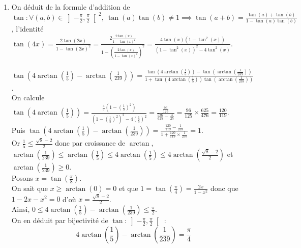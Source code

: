 \documentclass{book}
\begin{document}
\begin{enumerate}[leftmargin=*]
		$\forall x\in ]-1,1[,\ g'(x)=\displaystyle\frac{1}{\sqrt{1-x^2}}-\frac{1}{\sqrt{1-x^2}}=0$.\\
		Donc $\exists C'\in \R,\ \forall x\in ]-1,1[,\ g(x)=C'$.\\
		On calcule $C'=\displaystyle\lim_{x\to 1}g(x)=g(1)=\frac{\pi}{2}-0=\frac{\pi}{2}$.\\
		Ainsi $\forall x\in [-1,1],\ \arcsin(x)+\arccos(x)=\displaystyle\frac{\pi}{2}$.
		\item On déduit de la formule d'addition de $\tan : \forall (a,b)\in \displaystyle\left]-\frac{\pi}{2},\frac{\pi}{2}\right[^2,\ \tan(a)\tan(b)\ne 1\implies\tan(a+b)=\frac{\tan(a)+\tan(b)}{1-\tan(a)\tan(b)}$, l'identité $\tan(4x)=\displaystyle\frac{2\tan(2x)}{1-\tan(2x)^2}=\frac{\displaystyle2\frac{2\tan(x)}{1-\tan(x)^2}}{1-\displaystyle\left(\frac{2\tan(x)}{1-\tan(x)^2}\right)^2}=\frac{4\tan(x)(1-\tan^2(x))}{(1-\tan^2(x))^2-4\tan^2(x)}$.\\\\
		$\displaystyle\tan\left(4\arctan\left(\frac{1}{5}\right)-\arctan\left(\frac{1}{239}\right)\right)=\frac{\tan\left(4\arctan\left(\frac{1}{5}\right)\right)-\tan\left(\arctan\left(\frac{1}{239}\right)\right)}{1+\tan\left(4\arctan\left(\frac{1}{5}\right)\right)\tan\left(\arctan\left(\frac{1}{239}\right)\right)}$.\\
		On calcule $\displaystyle\tan\left(4\arctan\left(\frac{1}{5}\right)\right)=\frac{\displaystyle\frac{4}{5}\left(1-\left(\frac{1}{5}\right)^2\right)}{\displaystyle\left(1-\left(\frac{1}{5}\right)^2\right)^2-4\left(\frac{1}{5}\right)^2}=\frac{\displaystyle\frac{96}{125}}{\displaystyle\frac{576}{625}-\frac{4}{25}}=\frac{96}{125}\times\frac{625}{476}=\frac{120}{119}$.\\
		Puis $\displaystyle\tan\left(4\arctan\left(\frac{1}{5}\right)-\arctan\left(\frac{1}{239}\right)\right)=\frac{\displaystyle\frac{120}{119}-\frac{1}{239}}{\displaystyle1+\frac{120}{119}\times\frac{1}{239}}=1$.\\
		Or $\displaystyle\frac{1}{5}\leq \frac{\sqrt{8}-2}{2}$ donc par croissance de $\arctan$,\\
		$\displaystyle\arctan\left(\frac{1}{239}\right)\leq \arctan\left(\frac{1}{5}\right)\leq 4\arctan\left(\frac{1}{5}\right)\leq 4\arctan\left(\frac{\sqrt{8}-2}{2}\right)$ et $\displaystyle\arctan\left(\frac{1}{239}\right)\geq 0$.\\
		Posons $x=\displaystyle\tan\left(\frac{\pi}{8}\right)$.\\
		On sait que $x\geq \arctan(0)=0$ et que $1=\displaystyle\tan\left(\frac{\pi}{4}\right)=\frac{2x}{1-x^2}$ donc que $1-2x-x^2=0$ d'où $x=\displaystyle\frac{\sqrt{8}-2}{2}$.\\
		Ainsi, $\displaystyle 0\leq 4\arctan\left(\frac{1}{5}\right)-\arctan\left(\frac{1}{239}\right)\leq \frac{\pi}{2}$.\\
		On en déduit par bijectivité de $\tan:\displaystyle\left]-\frac{\pi}{2},\frac{\pi}{2}\right[$ :
		$$\displaystyle 4\arctan\left(\frac{1}{5}\right)-\arctan\left(\frac{1}{239}\right)=\frac{\pi}{4}$$
	\end{enumerate}
	
\end{document}
